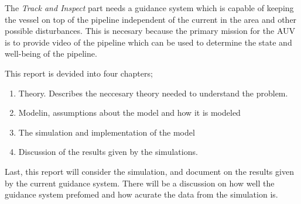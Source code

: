 	The \textit{Track and Inspect} part needs a guidance system which is capable of keeping the vessel on top of the pipeline independent of the current in the area and other possible disturbances. This is necesary because the primary mission for the AUV is to provide video of the pipeline which can be used to determine the state and well-being of the pipeline.
	
	This report is devided into four chapters;
	\begin{enumerate}
	 \item Theory. Describes the neccesary theory needed to understand the problem.
	 \item Modelin, assumptions about the model and how it is modeled
	 \item The simulation and implementation of the model
	 \item Discussion of the results given by the simulations.
	\end{enumerate}

	Last, this report will consider the simulation, and document on the results given by the current guidance system. There will be a discussion on how well the guidance system prefomed and how acurate the data from the simulation is. 
	
	
	

